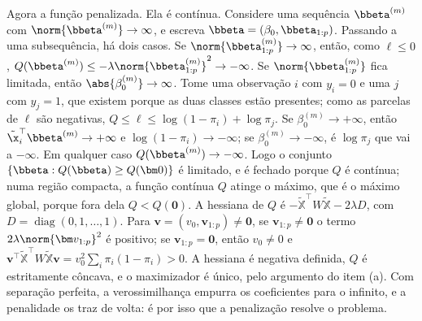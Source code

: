 \begin{solucao}
Agora a função penalizada. Ela é contínua. Considere uma sequência $\bbeta^{(m)}$ com
$\norm{\bbeta^{(m)}}\to\infty$, e escreva $\bbeta=(\beta_0,\bbeta_{1:p})$. Passando a uma
subsequência, há dois casos. Se $\norm{\bbeta^{(m)}_{1:p}}\to\infty$, então, como
$\ell\le0$, $Q(\bbeta^{(m)})\le-\lambda\norm{\bbeta^{(m)}_{1:p}}^2\to-\infty$. Se
$\norm{\bbeta^{(m)}_{1:p}}$ fica limitada, então $\abs{\beta_0^{(m)}}\to\infty$. Tome uma
observação $i$ com $y_i=0$ e uma $j$ com $y_j=1$, que existem porque as duas classes estão
presentes; como as parcelas de $\ell$ são negativas,
$Q\le\ell\le\log(1-\pi_i)+\log\pi_j$. Se $\beta_0^{(m)}\to+\infty$, então
$\tilde\x_i^\top\bbeta^{(m)}\to+\infty$ e $\log(1-\pi_i)\to-\infty$; se
$\beta_0^{(m)}\to-\infty$, é $\log\pi_j$ que vai a $-\infty$. Em qualquer caso
$Q(\bbeta^{(m)})\to-\infty$. Logo o conjunto $\{\bbeta: Q(\bbeta)\ge Q(\bm0)\}$ é limitado,
e é fechado porque $Q$ é contínua; numa região compacta, a função contínua $Q$ atinge o
máximo, que é o máximo global, porque fora dela $Q<Q(\bm0)$. A hessiana de $Q$ é
$-\tilde{\mathbb X}^\top W\tilde{\mathbb X}-2\lambda D$, com
$D=\operatorname{diag}(0,1,\dots,1)$. Para $\bm v=(v_0,\bm v_{1:p})\ne\bm0$, se
$\bm v_{1:p}\ne\bm0$ o termo $2\lambda\norm{\bm v_{1:p}}^2$ é positivo; se $\bm v_{1:p}=\bm0$,
então $v_0\ne0$ e
$\bm v^\top\tilde{\mathbb X}^\top W\tilde{\mathbb X}\bm v=v_0^2\sum_i\pi_i(1-\pi_i)>0$. A
hessiana é negativa definida, $Q$ é estritamente côncava, e o maximizador é único, pelo
argumento do item (a). Com separação perfeita, a verossimilhança empurra os coeficientes
para o infinito, e a penalidade os traz de volta: é por isso que a penalização resolve o
problema.
\end{solucao}
